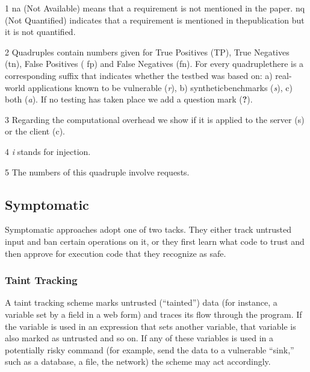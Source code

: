 \documentclass[conference]{IEEEtran}
\begin{document}
\begin{table}
\begin{threeparttable}
\begin{small}
\begin{tablenotes}
\begin{footnotesize}
        \item[1] {\sc na} (Not Available) means that a requirement is not mentioned in the paper.
  {\sc nq} (Not Quantified) indicates that a requirement is mentioned in the\newline publication
  but it is not quantified.
      \item[2] Quadruples contain numbers given for True Positives
        ({\sc TP}), True Negatives ({\sc tn}), False Positives ({\sc
          fp}) and False Negatives ({\sc fn}). For every quadruple\newline there is a corresponding suffix that indicates whether the testbed was
  based on: a) real-world applications known to be vulnerable ({\it r}), b) synthetic\newline benchmarks ({\it s}), c) both ({\it a}).
  If no testing has taken place we add a question mark ({\bf ?}).
    \item[3] Regarding the computational overhead we show if it is applied to the server ({\sc s}) or the client ({\sc c}). 
    \item[4] {\it i} stands for injection.
    \item[5] The numbers of this quadruple involve requests.
  \end{footnotesize}
    \end{tablenotes}
    \end{small}
    \end{threeparttable}
\end{table}

\subsection{Symptomatic}

Symptomatic approaches adopt one of two tacks. They either track
untrusted input and ban certain operations on it, or they first learn what
code to trust and then approve for execution code that they recognize
as safe.

\subsubsection{Taint Tracking}
\label{sec:taint}

A taint tracking scheme marks untrusted (``tainted'') data (for
instance, a variable set by a field in a web form) and traces its flow
through the program. If the variable is used in an expression that
sets another variable, that variable is also marked as untrusted and
so on. If any of these variables is used in a potentially risky
command (for example, send the data to a vulnerable ``sink,'' such as
a database, a file, the network) the scheme may act accordingly.
\end{document}
